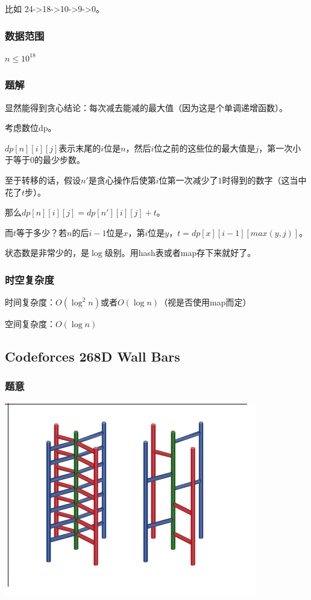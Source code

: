 \documentclass{ctexart}
\begin{document}
比如 24->18->10->9->0。
\subsubsection{数据范围}
$n \le 10^{18}$
\subsubsection{题解}
显然能得到贪心结论：每次减去能减的最大值（因为这是个单调递增函数）。

考虑数位dp。

$dp[n][i][j]$表示末尾的$i$位是$n$，然后$i$位之前的这些位的最大值是$j$，第一次小于等于$0$的最少步数。

至于转移的话，假设$n'$是贪心操作后使第$i$位第一次减少了$1$时得到的数字（这当中花了$t$步）。

那么$dp[n][i][j]=dp[n'][i][j]+t$。

而$t$等于多少？若$n$的后$i-1$位是$x$，第$i$位是$y$，$t=dp[x][i-1][max(y,j)]$。

状态数是非常少的，是$\log$级别。用hash表或者map存下来就好了。
\subsubsection{时空复杂度}
时间复杂度：$O(\log^2 n)$或者$O(\log n)$（视是否使用map而定）

空间复杂度：$O(\log n)$
\subsection{Codeforces 268D Wall Bars}
\subsubsection{题意}

\includegraphics{wall.png}
\end{document}
